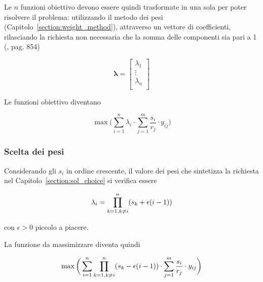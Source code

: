 Le $n$ funzioni obiettivo devono essere quindi trasformate in una sola per poter risolvere il problema:
utilizzando il metodo dei pesi (Capitolo~\ref{section:weight_method}), attraverso un vettore di coefficienti,
rilasciando la richiesta non necessaria che la somma delle componenti sia pari a 1
(\cite{Marler2009}, pag. 854)

\begin{equation*}
    \mathbf{\lambda} = \begin{bmatrix}
        \lambda_1 \\
        \vdots \\
        \lambda_n \\
    \end{bmatrix}
    \label{eq:}
\end{equation*}
 
Le funzioni obiettivo diventano

\begin{equation}
    \max \bigg( \sum_{i=1}^{n} \lambda_{i} \cdot \sum_{j = 1}^{m}\frac{s_i}{r_j} \cdot y_{ij}\bigg)
    \label{eq:}
\end{equation}

\subsubsection{Scelta dei pesi}

Considerando gli $s_i$ in ordine crescente, il valore dei pesi che sintetizza la richiesta 
nel Capitolo~\ref{section:sol_choice} si verifica essere

\begin{equation}
    \lambda_i = \prod_{k=1,\\ k\neq i}^{n} (s_k + \epsilon (i -1))
    \label{eq:}
\end{equation}

\noindent
con $\epsilon > 0$ piccolo a piacere.

La funzione da massimizzare diventa quindi

\begin{equation}
    \max \bigg( \sum_{i=1}^{n} \prod_{k=1,\\ k\neq i}^{n} (s_k - \epsilon (i- 1)) \cdot \sum_{j = 1}^{m}\frac{s_i}{r_j} \cdot y_{ij}\bigg)
    \label{eq:single_obj}
\end{equation}

